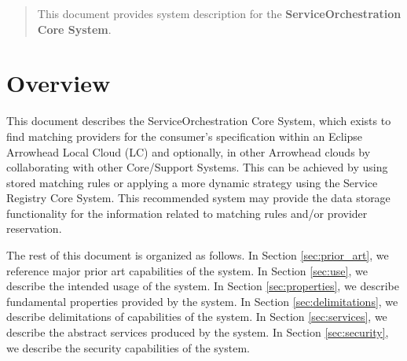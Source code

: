 \documentclass[a4paper]{arrowhead}
\begin{document}
\ArrowheadDate{\today}
\ArrowheadSetup

\begin{center}
  \vspace*{1cm}
  \huge{\arrowtitle}

  \vspace*{0.2cm}
  \LARGE{\arrowtype}
  \vspace*{1cm}

  \vspace*{\fill}


  \vspace*{1cm}
  \vspace*{\fill}

  \begin{abstract}
    This document provides system description for the \textbf{ServiceOrchestration Core System}.
  \end{abstract}

  \vspace*{1cm}

 \end{center}

\newpage

\tableofcontents
\newpage

\section{Overview}
\label{sec:overview}
\color{black}
This document describes the ServiceOrchestration Core System, which exists to find matching providers for the consumer's specification within an Eclipse Arrowhead Local Cloud (LC) and optionally, in other Arrowhead clouds by collaborating with other Core/Support Systems. This can be achieved by using stored matching rules or applying a more dynamic strategy using the Service Registry Core System. This recommended system may provide the data storage functionality for the information related to matching rules and/or provider reservation.

The rest of this document is organized as follows.
In Section \ref{sec:prior_art}, we reference major prior art capabilities
of the system.
In Section \ref{sec:use}, we describe the intended usage of the system.
In Section \ref{sec:properties}, we describe fundamental properties
provided by the system.
In Section \ref{sec:delimitations}, we describe delimitations of capabilities
of the system.
In Section \ref{sec:services}, we describe the abstract services produced by the system.
In Section \ref{sec:security}, we describe the security capabilities
of the system.
\end{document}
